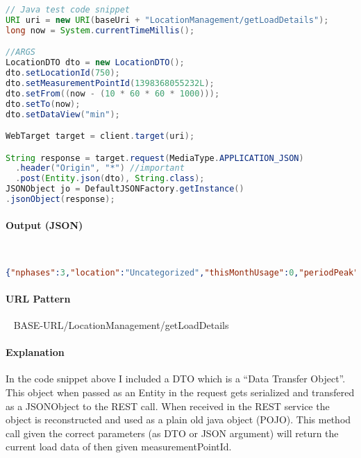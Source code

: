 \documentclass[
10pt, %
letterpaper, %
oneside, %
headinclude,footinclude, %
BCOR5mm, %
]{scrartcl}
\begin{document}
\begin{lstlisting}[language=Java]
// Java test code snippet
URI uri = new URI(baseUri + "LocationManagement/getLoadDetails");
long now = System.currentTimeMillis();

//ARGS
LocationDTO dto = new LocationDTO();
dto.setLocationId(750);
dto.setMeasurementPointId(1398368055232L);
dto.setFrom((now - (10 * 60 * 60 * 1000)));
dto.setTo(now);
dto.setDataView("min");

WebTarget target = client.target(uri);

String response = target.request(MediaType.APPLICATION_JSON)
  .header("Origin", "*") //important
  .post(Entity.json(dto), String.class);
JSONObject jo = DefaultJSONFactory.getInstance()
.jsonObject(response);
\end{lstlisting}

\paragraph{Output (JSON)} ~
\begin{lstlisting}[language=json]
{"nphases":3,"location":"Uncategorized","thisMonthUsage":0,"periodPeak":"746","hasBreaker":true,"peakCapacity":"0","endUse":"HVAC/Kitchen Hood Fan","periodTotal":"7437","electrical":"Panel KPL1 & 2 (208)/1 KHEF1","energyMates":[{"mac":"0x1240003BF/C"},{"mac":"0x1240003BF/B"},{"mac":"0x1240003BF/A"}],"ytdUsage":0,"name":"KHEF1","loadBalance":[1.682885348905083E11,1.7608065969601843E11,2.1944963546792365E11],"breaker":"1","breakerCapacity":"15","peakCapacityTime":-1234,"breakerPanel":"Panel KPL1 & 2 (208)"}
\end{lstlisting}

\paragraph{URL Pattern} 
~\newline
BASE-URL/LocationManagement/getLoadDetails

\paragraph{Explanation} In the code snippet above I included a DTO which is a ``Data Transfer Object''. This object when passed as an Entity in the request gets serialized and transfered as a JSONObject to the REST call. When received in the REST service the object is reconstructed and used as a plain old java object (POJO). This method call given the correct parameters (as DTO or JSON argument) will return the current load data of then given measurementPointId.
\end{document}
